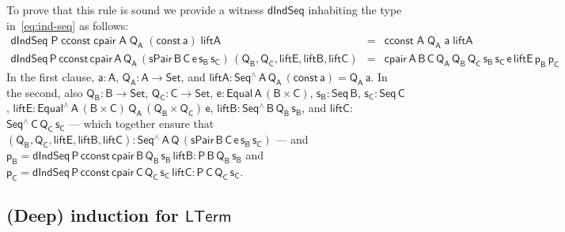 \documentclass[9pt]{entcs}
\begin{document}
To prove that this rule is sound we provide a witness
$\mathsf{dIndSeq}$ inhabiting the type in~\eqref{eq:ind-seq} as
follows:
\[\begin{array}{lll}
\mathsf{dIndSeq\;P\;cconst\;cpair\;A\;Q_A\;(const\,a)\;liftA}  &
    = &  \mathsf{cconst\;A\;Q_A\;a\;liftA}\\
\mathsf{dIndSeq\,P\,cconst\,cpair\,A\,Q_A\,(sPair\,B\,C\,e\,s_B\,s_C)\,
    (Q_B,Q_C, liftE, liftB, liftC)}  & = &
\mathsf{cpair\,A\,B\,C\,Q_A\,Q_B\,Q_C\,s_B\,s_C\,e\,liftE\,p_B\,p_C}
\end{array}\]
In the first clause, $\mathsf{a : A}$, $\mathsf{Q_A : A \to Set}$, and
$\mathsf{liftA : Seq^{\wedge}\,A\,Q_A\,(const\,a) = Q_A\,a}$. In the
second, also $\mathsf{Q_B : B \to Set}$, $\mathsf{Q_C : C \to Set}$,
$\mathsf{e : Equal\,A\,(B \times C)}$, $\mathsf{s_B : Seq\,B}$,
$\mathsf{s_C : Seq\,C}$, $\mathsf{liftE : Equal^{\wedge}\,A\, (B
  \times C)\, Q_A\, (Q_B \times Q_C) \, e}$, $\mathsf{liftB :
  Seq^{\wedge}\,B\,Q_B\,s_B}$, and $\mathsf{liftC :}$
$\mathsf{Seq^{\wedge}\,C\,Q_C\,s_C}$ --- which together ensure that
$\mathsf{(Q_B, Q_C, liftE, liftB, liftC) :
  Seq^{\wedge}\,A\,Q\,(sPair\,B\,C\,e\,s_B\,s_C)}$ --- and
$\mathsf{p_B} =\mathsf{dIndSeq\,P\,cconst\,cpair\,B\,Q_B\,s_B\,liftB :
  P\,B\,Q_B\,s_B}$ and $\mathsf{p_C}
=\mathsf{dIndSeq\,P\,cconst\,cpair\,C\,Q_C\,s_C\,liftC :
  P\,C\,Q_C\,s_C}$.

\subsection{(Deep) induction for $\mathsf{LTerm}$}\label{sec:ind-lam} 
\end{document}
